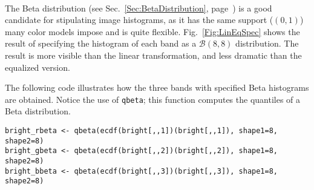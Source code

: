 \begin{figure*}[hbt]
\centering
{}\ 
\ 
\caption{Examples of linearization, equalization and histogram specification of data from an urban area}\label{Fig:LinEqSpec}
\end{figure*}

The Beta distribution (see Sec.~\ref{Sec:BetaDistribution}, page~\pageref{Sec:BetaDistribution}) is a good candidate for stipulating image histograms, as it has the same support ($(0,1)$) many color models impose and is quite flexible.
Fig.~\ref{Fig:LinEqSpec} shows the result of specifying the histogram of each band as a $\mathcal B(8,8)$ distribution.
The result is more visible than the linear transformation, and less dramatic than the equalized version.

The following code illustrates how the three bands with specified Beta histograms are obtained.
Notice the use of \verb|qbeta|; this function computes the quantiles of a Beta distribution.
\begin{lstlisting}
bright_rbeta <- qbeta(ecdf(bright[,,1])(bright[,,1]), shape1=8, shape2=8)
bright_gbeta <- qbeta(ecdf(bright[,,2])(bright[,,2]), shape1=8, shape2=8)
bright_bbeta <- qbeta(ecdf(bright[,,3])(bright[,,3]), shape1=8, shape2=8)
\end{lstlisting}